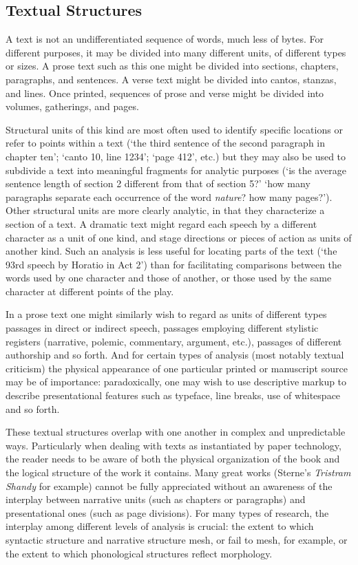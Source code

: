 \subsection[{Textual Structures}]{Textual Structures}\label{SG12}\par
A text is not an undifferentiated sequence of words, much less of bytes. For different purposes, it may be divided into many different units, of different types or sizes. A prose text such as this one might be divided into sections, chapters, paragraphs, and sentences. A verse text might be divided into cantos, stanzas, and lines. Once printed, sequences of prose and verse might be divided into volumes, gatherings, and pages.\par
Structural units of this kind are most often used to identify specific locations or refer to points within a text (‘the third sentence of the second paragraph in chapter ten’; ‘canto 10, line 1234’; ‘page 412’, etc.) but they may also be used to subdivide a text into meaningful fragments for analytic purposes (‘is the average sentence length of section 2 different from that of section 5?’ ‘how many paragraphs separate each occurrence of the word \textit{nature}? how many pages?’). Other structural units are more clearly analytic, in that they characterize a section of a text. A dramatic text might regard each speech by a different character as a unit of one kind, and stage directions or pieces of action as units of another kind. Such an analysis is less useful for locating parts of the text (‘the 93rd speech by Horatio in Act 2’) than for facilitating comparisons between the words used by one character and those of another, or those used by the same character at different points of the play.\par
In a prose text one might similarly wish to regard as units of different types passages in direct or indirect speech, passages employing different stylistic registers (narrative, polemic, commentary, argument, etc.), passages of different authorship and so forth. And for certain types of analysis (most notably textual criticism) the physical appearance of one particular printed or manuscript source may be of importance: paradoxically, one may wish to use descriptive markup to describe presentational features such as typeface, line breaks, use of whitespace and so forth.\par
These textual structures overlap with one another in complex and unpredictable ways. Particularly when dealing with texts as instantiated by paper technology, the reader needs to be aware of both the physical organization of the book and the logical structure of the work it contains. Many great works (Sterne's \textit{Tristram Shandy} for example) cannot be fully appreciated without an awareness of the interplay between narrative units (such as chapters or paragraphs) and presentational ones (such as page divisions). For many types of research, the interplay among different levels of analysis is crucial: the extent to which syntactic structure and narrative structure mesh, or fail to mesh, for example, or the extent to which phonological structures reflect morphology.
